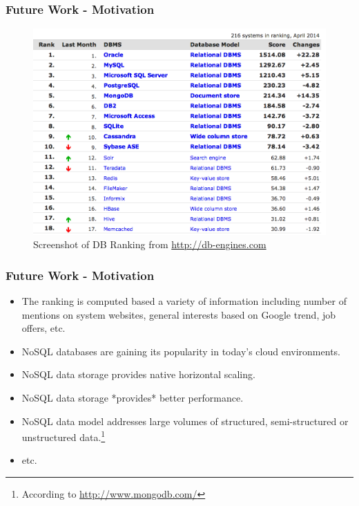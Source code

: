 \documentclass{beamer}
\begin{document}
\begin{frame}
  \frametitle{Future Work - Motivation}
  \begin{figure}
    \centering
    \includegraphics[scale=0.28]{img/DB_Ranking_2014_April.png}
    \caption{Screenshot of DB Ranking from \url{http://db-engines.com}}
  \end{figure}
\end {frame}



\begin{frame}
  \frametitle{Future Work - Motivation}
  \begin{itemize}
  \item The ranking is computed based a variety of information including number
    of mentions on system websites, general interests based on Google trend,
    job offers, etc.
  \item NoSQL databases are gaining its popularity in today's cloud
    environments.
  \item NoSQL data storage provides native horizontal scaling.
  \item NoSQL data storage *provides* better performance.
  \item NoSQL data model addresses large volumes of structured,
    semi-structured or unstructured data.\footnote{According to
      \url{http://www.mongodb.com/}}
  \item etc.
  \end{itemize}
\end{frame}
\end{document}
